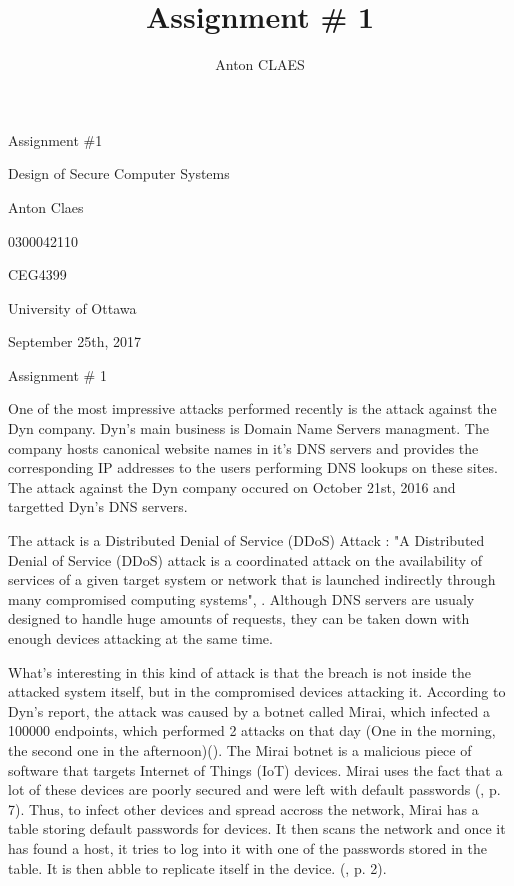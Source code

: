 \documentclass[a4paper,man,natbib,12]{apa6}
\title{Assignment \# 1}
\author{Anton CLAES}
\affiliation{University of Ottawa}
\begin{document}
\thispagestyle{empty}

\begin{center}
\vspace*{5\baselineskip}
Assignment \#1

Design of Secure Computer Systems

\vspace*{10\baselineskip}

Anton Claes

0300042110

CEG4399

University of Ottawa

September 25th, 2017

\newpage

Assignment \# 1
\end{center}

\qquad One of the most impressive attacks performed recently is the attack against the Dyn company. Dyn's main business is Domain Name Servers managment. The company hosts canonical website names in it's DNS servers and provides the corresponding IP addresses to the users performing DNS lookups on these sites. The attack against the Dyn company occured on October 21st, 2016 and targetted Dyn's DNS servers. 

\qquad The attack is a Distributed Denial of Service (DDoS) Attack : "A Distributed Denial of
Service (DDoS) attack is a coordinated attack on the
availability of services of a given target system or network
that is launched indirectly through many compromised
computing systems", \cite{DDoS}. Although DNS servers are usualy designed to handle huge amounts of requests, they can be taken down with enough devices attacking at the same time. 

\qquad What's interesting in this kind of attack is that the breach is not inside the attacked system itself, but in the compromised devices attacking it. According to Dyn's report, the attack was caused by a botnet called Mirai, which infected a 100000 endpoints, which performed 2 attacks on that day (One in the morning, the second one in the afternoon)(\cite{Dyn}). The Mirai botnet is a malicious piece of software that targets Internet of Things (IoT) devices. Mirai uses the fact that a lot of these devices are poorly secured and were left with default passwords (\cite{46301}, p. 7). Thus, to infect other devices and spread accross the network, Mirai has a table storing default passwords for devices. It then scans the network and once it has found a host, it tries to log into it with one of the passwords stored in the table. It is then abble to replicate itself in the device. (\cite{46301}, p. 2). 
\end{document}
